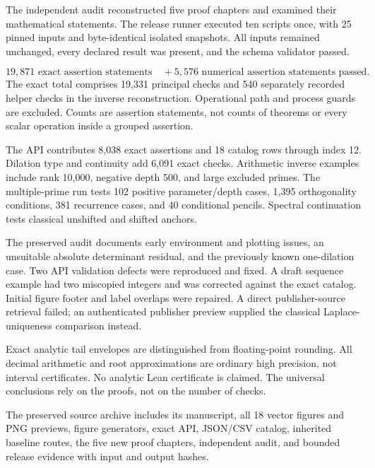 The independent audit reconstructed five proof chapters and examined their mathematical statements. The release runner executed ten scripts once, with
25 pinned inputs and byte-identical isolated snapshots. All inputs remained
unchanged, every declared result was present, and the schema validator passed.

\[
\boxed{19{,}871\text{ exact assertion statements}\quad+
5{,}576\text{ numerical assertion statements passed}.}
\]
The exact total comprises 19,331 principal checks and 540 separately recorded
helper checks in the inverse reconstruction. Operational path and process
guards are excluded. Counts are assertion statements, not counts of theorems
or every scalar operation inside a grouped assertion.

The API contributes 8,038 exact assertions and 18 catalog rows through index
12. Dilation type and continuity add 6,091 exact checks. Arithmetic inverse
examples include rank 10,000, negative depth 500, and large excluded primes.
The multiple-prime run tests 102 positive parameter/depth cases, 1,395
orthogonality conditions, 381 recurrence cases, and 40 conditional pencils.
Spectral continuation tests classical unshifted and shifted anchors.

The preserved audit documents early environment and plotting issues, an unsuitable absolute determinant residual, and the previously known one-dilation case.
Two API validation defects were reproduced and fixed. A draft
sequence example had two miscopied integers and was corrected against the
exact catalog. Initial figure footer and label overlaps were repaired.
A direct publisher-source retrieval failed; an authenticated publisher
preview supplied the classical Laplace-uniqueness comparison instead.

Exact analytic tail envelopes are distinguished from floating-point rounding.
All decimal arithmetic and root approximations are ordinary high precision,
not interval certificates. No analytic Lean certificate is claimed.
The universal conclusions rely on the proofs, not on the number of checks.

The preserved source archive includes its manuscript, all 18 vector figures and PNG
previews, figure generators, exact API, JSON/CSV catalog, inherited baseline
routes, the five new proof chapters, independent audit, and bounded release
evidence with input and output hashes.

